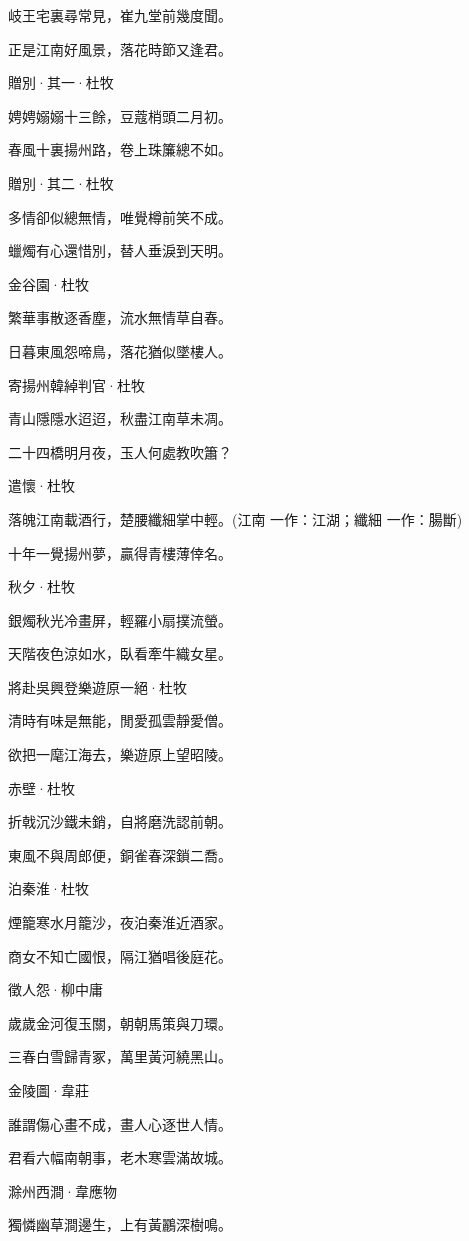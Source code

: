 \documentclass[12pt,a4paper]{ctexbook}
\begin{document}
岐王宅裏尋常見，崔九堂前幾度聞。\par
正是江南好風景，落花時節又逢君。\par
贈別·其一·杜牧\par
娉娉嫋嫋十三餘，豆蔻梢頭二月初。\par
春風十裏揚州路，卷上珠簾總不如。\par
贈別·其二·杜牧\par
多情卻似總無情，唯覺樽前笑不成。\par
蠟燭有心還惜別，替人垂淚到天明。\par
金谷園·杜牧\par
繁華事散逐香塵，流水無情草自春。\par
日暮東風怨啼鳥，落花猶似墜樓人。\par
寄揚州韓綽判官·杜牧\par
青山隱隱水迢迢，秋盡江南草未凋。\par
二十四橋明月夜，玉人何處教吹簫？\par
遣懷·杜牧\par
落魄江南載酒行，楚腰纖細掌中輕。(江南 一作：江湖；纖細 一作：腸斷)\par
十年一覺揚州夢，贏得青樓薄倖名。\par
秋夕·杜牧\par
銀燭秋光冷畫屏，輕羅小扇撲流螢。\par
天階夜色涼如水，臥看牽牛織女星。\par
將赴吳興登樂遊原一絕·杜牧\par
清時有味是無能，閒愛孤雲靜愛僧。\par
欲把一麾江海去，樂遊原上望昭陵。\par
赤壁·杜牧\par
折戟沉沙鐵未銷，自將磨洗認前朝。\par
東風不與周郎便，銅雀春深鎖二喬。\par
泊秦淮·杜牧\par
煙籠寒水月籠沙，夜泊秦淮近酒家。\par
商女不知亡國恨，隔江猶唱後庭花。\par
徵人怨·柳中庸\par
歲歲金河復玉關，朝朝馬策與刀環。\par
三春白雪歸青冢，萬里黃河繞黑山。\par
金陵圖·韋莊\par
誰謂傷心畫不成，畫人心逐世人情。\par
君看六幅南朝事，老木寒雲滿故城。\par
滁州西澗·韋應物\par
獨憐幽草澗邊生，上有黃鸝深樹鳴。\par
\end{document}
